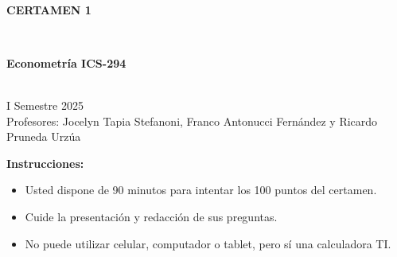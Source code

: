 \documentclass[10pt,a4paper]{article}
\begin{document}
\vspace{5cm}



\begin{center}
\begin{large}
\textbf{\\CERTAMEN 1}
\end{large}\\
\end{center}

\begin{center}
\begin{large}
\textbf{Econometría ICS-294}
\end{large}\\
\vspace{0.2cm}
I Semestre 2025\\
Profesores: Jocelyn Tapia Stefanoni, Franco Antonucci Fernández y Ricardo Pruneda Urz\'ua\\
\end{center}

\textbf{Instrucciones:} 

\begin{itemize}

    \item Usted dispone de 90 minutos  para intentar los 100 puntos del certamen.
    \item Cuide la presentación y redacción de sus preguntas.
    \item No puede utilizar celular, computador o tablet, pero sí una calculadora TI.
     
\end{itemize}
\end{document}
